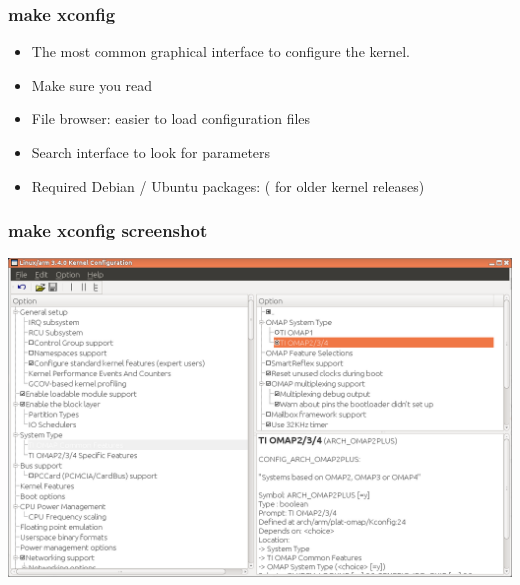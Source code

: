 \begin{frame}
  \frametitle{make xconfig}
  \begin{itemize}
  \item The most common graphical interface to configure the kernel.
  \item Make sure you read\\
  \item File browser: easier to load configuration files
  \item Search interface to look for parameters
  \item Required Debian / Ubuntu packages:  
    ( for older kernel releases)
  \end{itemize}
\end{frame}

\begin{frame}
  \frametitle{make xconfig screenshot}
  \begin{center}
    \includegraphics[width=\textwidth]{slides/sysdev-linux-intro-configuration/xconfig-screenshot.png}
  \end{center}
\end{frame}

